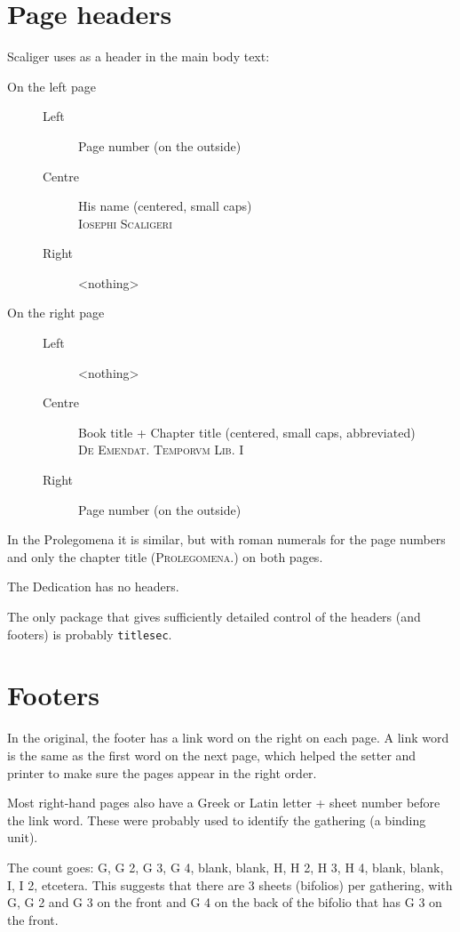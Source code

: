 \documentclass[12pt]{report}
\begin{document}
\section{Page headers}
Scaliger uses as a header in the main body text:
\begin{description}
\item[On the left page] \hfill
    \begin{description}
    \item[Left] Page number (on the outside)
    \item[Centre] His name (centered, small caps) \\
      \textsc{Iosephi Scaligeri}
    \item[Right] <nothing>
    \end{description}
\item[On the right page] \hfill
    \begin{description}
    \item[Left] <nothing>
    \item[Centre] Book title + Chapter title (centered, small caps, abbreviated) \\
       \textsc{De Emendat. Temporvm Lib. I}
    \item[Right] Page number (on the outside)
    \end{description}
\end{description}

In the Prolegomena it is similar, but with roman numerals for the page numbers and only the chapter title
\textsc{(Prolegomena.)} on both pages. 

The Dedication has no headers.

The only package that gives sufficiently detailed control of the headers (and footers) is probably \texttt{titlesec}.

\section{Footers}
In the original, the footer has a link word on the right on each page. A link word is the same as the first word on the
next page, which helped the setter and printer to make sure the pages appear in the right order.

Most right-hand pages also have a Greek or Latin letter + sheet number before the link word.
These were probably used to identify the gathering (a binding unit).

The count goes:
G, G 2, G 3, G 4, blank, blank, H, H 2, H 3, H 4, blank, blank, I, I 2, etcetera.
This suggests that there are 3 sheets (bifolios) per gathering,
with G, G 2 and G 3 on the front and G 4 on the back of the bifolio that has G 3 on the front.
\end{document}
